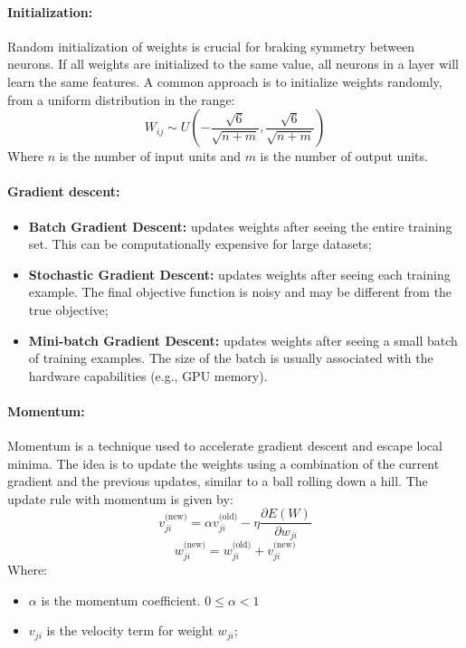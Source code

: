 \paragraph{Initialization:}
Random initialization of weights is crucial for braking symmetry between neurons. If all weights are initialized to the same value, all neurons in a layer will learn the same features.
A common approach is to initialize weights randomly, from a uniform distribution in the range:
\[ W_{ij} \sim U\left(-\frac{\sqrt{6}}{\sqrt{n + m}}, \frac{\sqrt{6}}{\sqrt{n + m}}\right) \]
Where $n$ is the number of input units and $m$ is the number of output units.

\paragraph{Gradient descent:}
\begin{itemize}
  \item \textbf{Batch Gradient Descent:} updates weights after seeing the entire training set. This can be computationally expensive for large datasets;
  \item \textbf{Stochastic Gradient Descent:} updates weights after seeing each training example. The final objective function is noisy and may be different from the true objective;
  \item \textbf{Mini-batch Gradient Descent:} updates weights after seeing a small batch of training examples. The size of the batch is usually associated with the hardware capabilities (e.g., GPU memory). 
\end{itemize}

\paragraph{Momentum:}
Momentum is a technique used to accelerate gradient descent and escape local minima. The idea is to update the weights using
a combination of the current gradient and the previous updates, similar to a ball rolling down a hill.
The update rule with momentum is given by:
\[v_{ji}^\text{(new)} = \alpha v_{ji}^\text{(old)} - \eta \frac{\partial E(W)}{\partial w_{ji}}\]
\[w_{ji}^\text{(new)} = w_{ji}^\text{(old)} + v_{ji}^\text{(new)}\]
Where:
\begin{itemize}
    \item $\alpha$ is the momentum coefficient. $0 \le \alpha < 1$
    \item $v_{ji}$ is the velocity term for weight $w_{ji}$;
\end{itemize}

